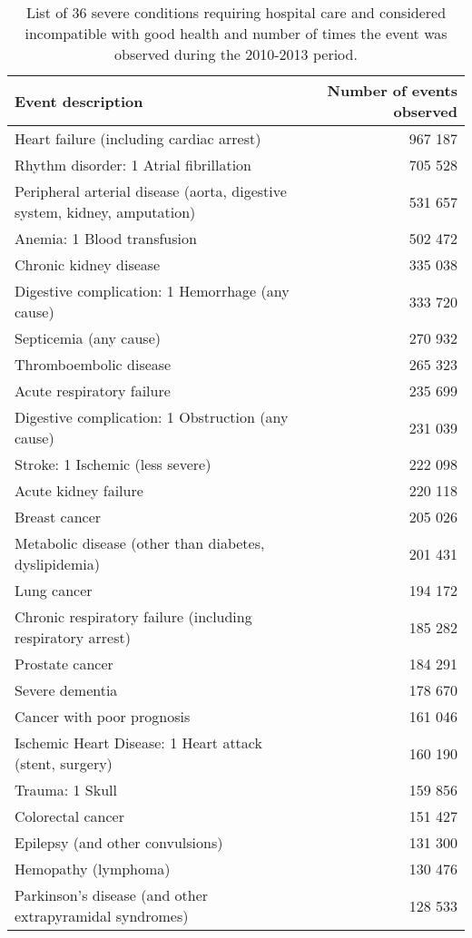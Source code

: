 \documentclass{article}
\begin{document}
\begin{table}

\caption{\label{tab:pathol}List of 36 severe conditions requiring hospital care and considered incompatible with good health and number of times the event was observed during the 2010-2013 period.}
\centering
\begin{tabular}[t]{>{\raggedright\arraybackslash}p{20em}r}
\toprule
Event description & Number of events observed\\
\midrule
Heart failure (including cardiac arrest) & 967 187\\
Rhythm disorder: 1 Atrial fibrillation & 705 528\\
Peripheral arterial disease (aorta, digestive system, kidney, amputation) & 531 657\\
Anemia: 1 Blood transfusion & 502 472\\
Chronic kidney disease & 335 038\\
Digestive complication: 1 Hemorrhage (any cause) & 333 720\\
Septicemia (any cause) & 270 932\\
Thromboembolic disease & 265 323\\
Acute respiratory failure & 235 699\\
Digestive complication: 1 Obstruction (any cause) & 231 039\\
Stroke: 1 Ischemic (less severe) & 222 098\\
Acute kidney failure & 220 118\\
Breast cancer & 205 026\\
Metabolic disease (other than diabetes, dyslipidemia) & 201 431\\
Lung cancer & 194 172\\
Chronic respiratory failure (including respiratory arrest) & 185 282\\
Prostate cancer & 184 291\\
Severe dementia & 178 670\\
Cancer with poor prognosis & 161 046\\
Ischemic Heart Disease: 1 Heart attack (stent, surgery) & 160 190\\
Trauma: 1 Skull & 159 856\\
Colorectal cancer & 151 427\\
Epilepsy (and other convulsions) & 131 300\\
Hemopathy (lymphoma) & 130 476\\
Parkinson's disease (and other extrapyramidal syndromes) & 128 533\\

\end{tabular}
\end{table}
\end{document}

